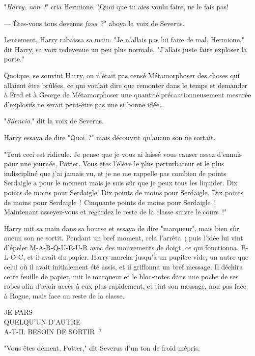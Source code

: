 "\emph{Harry, non~!}" cria Hermione. "Quoi que tu aies voulu faire, ne le fais pas!

--- Êtes-vous tous devenus \emph{fous}~?" aboya la voix de Severus.

Lentement, Harry rabaissa sa main. "Je n'allais pas lui faire de mal, Hermione," dit Harry, sa voix redevenue un peu plus normale. "J'allais juste faire exploser la porte."

Quoique, se souvint Harry, on n'était pas censé Métamorphoser des choses qui allaient être brûlées, ce qui voulait dire que remonter dans le temps et demander à Fred et à George de Métamorphoser une quantité précautionneusement mesurée d'explosifs ne serait peut-être pas une si bonne idée…

"\emph{Silencio}," dit la voix de Severus.

Harry essaya de dire "Quoi~?" mais découvrit qu'aucun son ne sortait.

"Tout ceci est ridicule. Je pense que je vous ai laissé vous causer assez d'ennuis pour une journée, Potter. Vous êtes l'élève le plus perturbateur et le plus indiscipliné que j'ai jamais vu, et je ne me rappelle pas combien de points Serdaigle a pour le moment mais je suis sûr que je peux tous les liquider. Dix points de moins pour Serdaigle. Dix points de moins pour Serdaigle. Dix points de moins pour Serdaigle~! Cinquante points de moins pour Serdaigle~! Maintenant asseyez-vous et regardez le reste de la classe suivre le cours~!"

Harry mit sa main dans sa bourse et essaya de dire "marqueur", mais bien sûr aucun son ne sortit. Pendant un bref moment, cela l'arrêta~; puis l'idée lui vint d'épeler M-A-R-Q-U-E-U-R avec des mouvements de doigt, ce qui fonctionna. B-L-O-C, et il avait du papier. Harry marcha jusqu'à un pupitre vide, un autre que celui où il avait initialement été assis, et il griffonna un bref message. Il déchira cette feuille de papier, mit le marqueur et le bloc-notes dans une poche de ses robes afin d'avoir accès à eux plus rapidement, et tint son message, non pas face à Rogue, mais face au reste de la classe.

\begin{writtenNote}
JE PARS\\
QUELQU'UN D'AUTRE\\
A-T-IL BESOIN DE SORTIR~?
\end{writtenNote}

"Vous êtes dément, Potter," dit Severus d'un ton de froid mépris.

